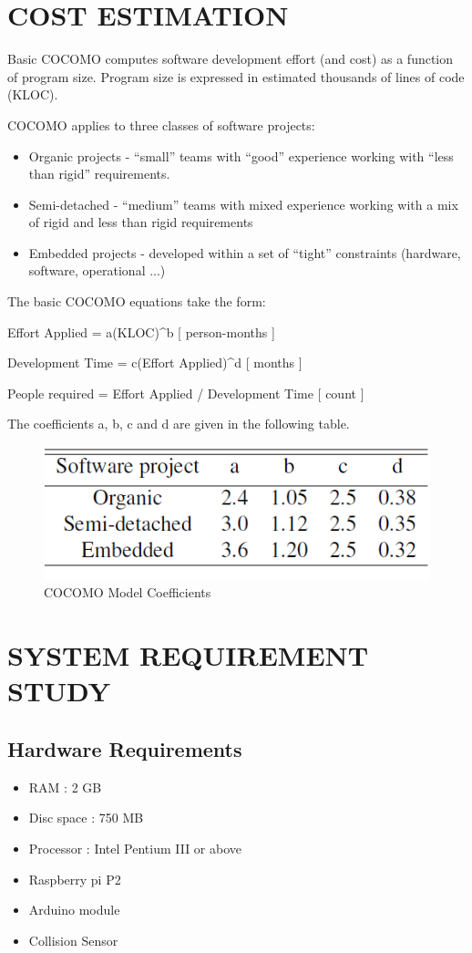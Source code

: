 \documentclass[12pt,a4paper,oneside]{report}
\begin{document}
{\section{COST ESTIMATION}
\par Basic COCOMO computes software development effort (and cost) as a function of program
size. Program size is expressed in estimated thousands of lines of code (KLOC).
\par COCOMO applies to three classes of software projects:
\begin{itemize}
\item  Organic projects - “small” teams with “good” experience working with “less than rigid”
requirements.
\item Semi-detached - “medium” teams with mixed experience working with a mix of rigid
and less than rigid requirements
\item Embedded projects - developed within a set of “tight” constraints (hardware, software,
operational ...)
\end{itemize}
\par The basic COCOMO equations take the form:
\par Effort Applied = a(KLOC)\textasciicircum b [ person-months ]
\par Development Time = c(Effort Applied)\textasciicircum d [ months ]
\par People required = Effort Applied / Development Time [ count ]
\par The coefficients a, b, c and d are given in the following table.
\begin{figure}[h]
\begin{center}
\includegraphics[scale=.6]{cocomo.PNG}
\caption{COCOMO Model Coefficients}
\label{COCOMO Model Coefficients}
\end{center}
\end{figure}
\section{SYSTEM REQUIREMENT STUDY}
\subsection{Hardware Requirements}
\begin{itemize}
\item RAM : 2 GB
\item Disc space : 750 MB
\item Processor : Intel Pentium III or above
\item Raspberry pi P2
\item Arduino module
\item Collision Sensor
\end{itemize}

}
\end{document}
